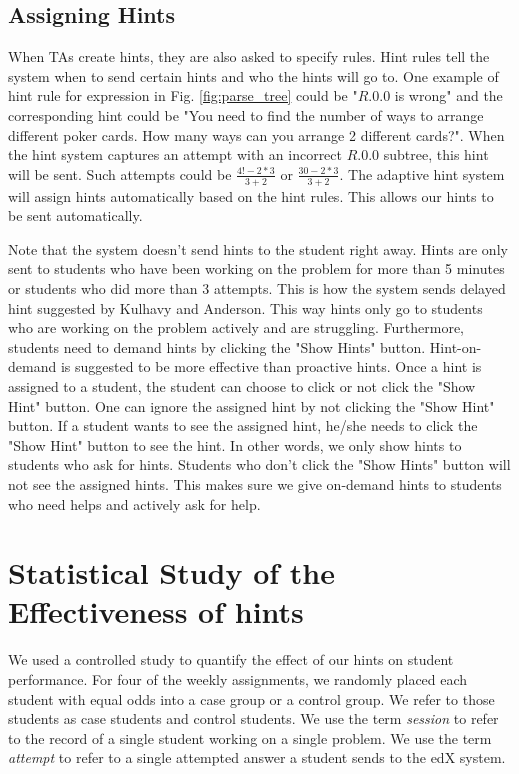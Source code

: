 \documentclass{sigchi/sigchi}
\begin{document}
\subsection*{Assigning Hints}
When TAs create hints, they are also asked to specify rules. Hint rules tell the system when to send certain hints and who the hints will go to. One example of hint rule for expression in Fig. \ref{fig:parse_tree} could be "$R.0.0$ is wrong" and the corresponding hint could be "You need to find the number of ways to arrange different poker cards. How many ways can you arrange 2 different cards?". When the hint system captures an attempt with an incorrect $R.0.0$ subtree, this hint will be sent. Such attempts could be $\frac{4!-2*3}{3+2}$ or $\frac{30-2*3}{3+2}$. The adaptive hint system will assign hints automatically based on the hint rules. This allows our hints to be sent automatically.

Note that the system doesn't send hints to the student right away. Hints are only sent to students who have been working on the problem for more than 5 minutes or students who did more than 3 attempts. This is how the system sends delayed hint suggested by Kulhavy and Anderson\cite{Kulhavy1972}. This way hints only go to students who are working on the problem actively and are struggling. Furthermore, students need to demand hints by clicking the "Show Hints" button. Hint-on-demand is suggested to be more effective than proactive hints\cite{Razzaq2010}. Once a hint is assigned to a student, the student can choose to click or not click the "Show Hint" button. One can ignore the assigned hint by not clicking the "Show Hint" button. If a student wants to see the assigned hint, he/she needs to click the "Show Hint" button to see the hint. In other words, we only show hints to students who ask for hints. Students who don't click the "Show Hints" button will not see the assigned hints. This makes sure we give on-demand hints to students who need helps and actively ask for help. 


\section{Statistical Study of the Effectiveness of hints}

We used a controlled study to quantify the effect of our hints on
student performance. For four of the weekly assignments, we randomly
placed each student with equal odds into a case group or a control
group. We refer to those students as case students and control
students.  We use the term {\em session} to refer to the record of a
single student working on a single problem. We use the term {\em
  attempt} to refer to a single attempted answer a student sends to
the edX system.
\end{document}
